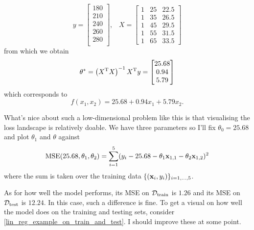 \documentclass[11pt]{article}
\begin{document}
$$
y=
\begin{bmatrix}
    180\\
    210\\
    240\\
    260\\
    280\\
\end{bmatrix},
\hspace{10pt}
X=
\begin{bmatrix}
    1 & 25 & 22.5 \\
    1 & 35 & 26.5 \\
    1 & 45 & 29.5 \\
    1 & 55 & 31.5 \\
    1 & 65 & 33.5
\end{bmatrix}
$$
from which we obtain
$$
\theta^{*}
=
\left(X^{\text{T}}X\right)^{-1}X^{\text{T}}y
=
\begin{bmatrix}
    25.68\\
    0.94\\
    5.79
\end{bmatrix}
$$
which corresponds to
$$
f(x_1,x_2)=25.68+0.94x_1+5.79x_2.
$$

What's nice about such a low-dimensional problem like this is that visualising the loss landscape is relatively doable. We have three parameters so I'll fix $\theta_0=25.68$ and plot $\theta_1$ and $\theta$ against 
$$
\text{MSE}(25.68, \theta_1, \theta_2)
=
\sum_{i=1}^5 (y_i-25.68-\theta_1\mathbf{x}_{1,1}-\theta_2\mathbf{x}_{1,2})^2
$$
where the sum is taken over the training data $\{(\mathbf{x}_i,y_i)\}_{i=1,\dots,5}$.

As for how well the model performs, its MSE on $\mathcal{D}_{\text{train}}$ is $1.26$ and its MSE on $\mathcal{D}_{\text{test}}$ is $12.24$. In this case, such a difference is fine. To get a visual on how well the model does on the training and testing sets, consider \autoref{lin_reg_example_on_train_and_test}. I should improve these at some point.
\end{document}
